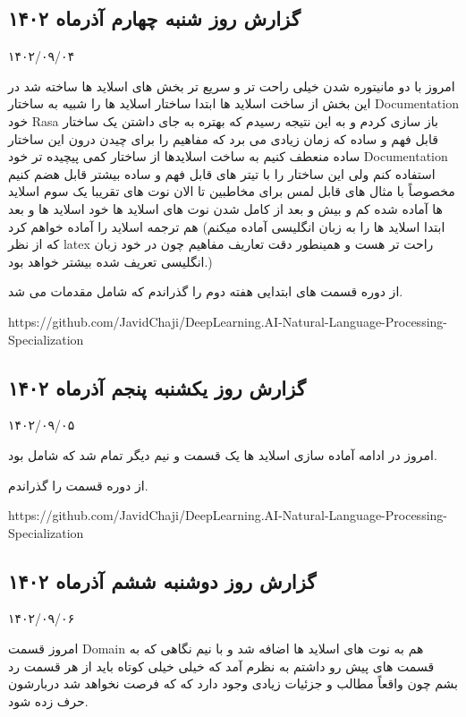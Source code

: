 \subsection{گزارش روز شنبه چهارم آذر‌ماه ۱۴۰۲}

۱۴۰۲/۰۹/۰۴

امروز با دو مانیتوره شدن خیلی راحت تر و سریع تر بخش های  اسلاید ها ساخته شد در این بخش از ساخت اسلاید ها ابتدا ساختار اسلاید ها را شبیه به ساختار Documentation خود Rasa باز سازی کردم و به این نتیجه رسیدم که بهتره به جای داشتن یک ساختار قابل فهم و ساده که زمان زیادی می‌
برد که مفاهیم را برای چیدن درون این ساختار ساده منعطف کنیم به ساخت اسلایدها از ساختار کمی پیچیده تر خود Documentation استفاده کنم ولی این ساختار را با تیتر های قابل فهم و ساده بیشتر قابل هضم کنیم مخصوصاً با مثال های قابل لمس برای مخاطبین 
تا الان نوت های تقریبا یک سوم اسلاید ها آماده شده کم و بیش و بعد از کامل شدن نوت های اسلاید ها خود اسلاید ها و بعد هم ترجمه اسلاید را آماده خواهم کرد (ابتدا اسلاید ها را به زبان انگلیسی آماده میکنم که از نظر latex راحت تر هست و همینطور دقت تعاریف مفاهیم چون در خود زبان انگلیسی تعریف شده بیشتر خواهد بود.)

از دوره  قسمت های ابتدایی هفته دوم را گذراندم که شامل مقدمات  می شد.

https://github.com/JavidChaji/DeepLearning.AI-Natural-Language-Processing-Specialization


\subsection{گزارش روز یکشنبه پنجم آذر‌ماه ۱۴۰۲}

۱۴۰۲/۰۹/۰۵

امروز در ادامه آماده سازی اسلاید ها یک قسمت و نیم دیگر تمام شد که شامل  بود.

از دوره  قسمت  را گذراندم.

https://github.com/JavidChaji/DeepLearning.AI-Natural-Language-Processing-Specialization


\subsection{گزارش روز دوشنبه ششم آذرماه ۱۴۰۲}

۱۴۰۲/۰۹/۰۶

امروز قسمت Domain هم به نوت های اسلاید ها اضافه شد و با نیم نگاهی که به قسمت های پیش رو داشتم به نظرم آمد که خیلی خیلی کوتاه باید از هر قسمت رد بشم چون واقعاً مطالب و جزئیات زیادی وجود دارد که که فرصت نخواهد شد دربارشون حرف زده شود.

